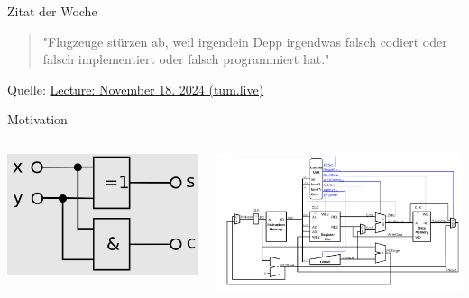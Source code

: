 \documentclass[
  german,            %
  aspectratio=169,    %
]{tumbeamer}
\begin{document}
\begin{frame}[c]{}{}
  \begin{center}
    \vspace{0.5cm}
    \begin{block}{Zitat der Woche}
      \vspace{0.5cm}
      \begin{quote}
        "Flugzeuge stürzen ab, weil irgendein Depp irgendwas falsch codiert oder falsch implementiert oder falsch programmiert hat."    
        \vspace{0.5cm}
      \end{quote}
      \vspace{0.5cm}
    \end{block}
    \vspace{0.5cm}
    Quelle: \href{https://tum.live/w/ws24EidR/50021?t=2268}{Lecture: November 18. 2024 (tum.live)}
  \end{center}
\end{frame}

\begin{frame}[c]{Motivation}{}
  \begin{columns}
    \begin{column}{0.3\textwidth}
      \centering
      \includegraphics[width=\textwidth]{w06_halfadder_wikipedia.png}
    \end{column}
    \begin{column}{0.7\textwidth}
      \includegraphics[width=\textwidth]{w06_singlecycleriscv_lv.png}
    \end{column}
  \end{columns}
\end{frame}
\end{document}
